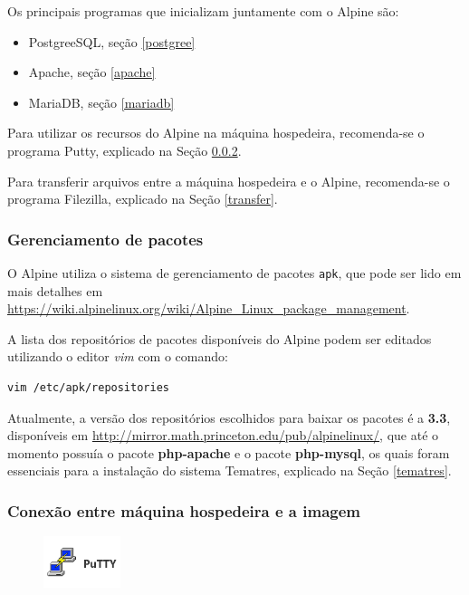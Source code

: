 Os principais programas que inicializam juntamente com o Alpine são:

\begin{itemize}
    \item PostgreeSQL, seção \ref{postgree}
    \item Apache, seção \ref{apache}
    \item MariaDB, seção \ref{mariadb}
\end{itemize}

Para utilizar os recursos do Alpine na máquina hospedeira, recomenda-se o programa Putty, explicado na Seção \ref{conexao}.

Para transferir arquivos entre a máquina hospedeira e o Alpine, recomenda-se o programa Filezilla, explicado na Seção \ref{transfer}.

\subsubsection{Gerenciamento de pacotes}

O Alpine utiliza o sistema de gerenciamento de pacotes \lstinline{apk}, que pode ser lido em mais detalhes em \url{https://wiki.alpinelinux.org/wiki/Alpine_Linux_package_management}.

A lista dos repositórios de pacotes disponíveis do Alpine podem ser editados utilizando o editor \textit{vim} com o comando:

\begin{lstlisting}[language=bash]
    vim /etc/apk/repositories
\end{lstlisting}

Atualmente, a versão dos repositórios escolhidos para baixar os pacotes é a \textbf{3.3}, disponíveis em \url{http://mirror.math.princeton.edu/pub/alpinelinux/}, que até o momento possuía o pacote \textbf{php-apache} e o pacote \textbf{php-mysql}, os quais foram essenciais para a instalação do sistema Tematres, explicado na Seção \ref{tematres}.

\subsubsection{Conexão entre máquina hospedeira e a imagem}\label{conexao}

\begin{figure} %
    \centering
    \includegraphics[width=0.2\textwidth]{../images/putty1.png}
\end{figure}


